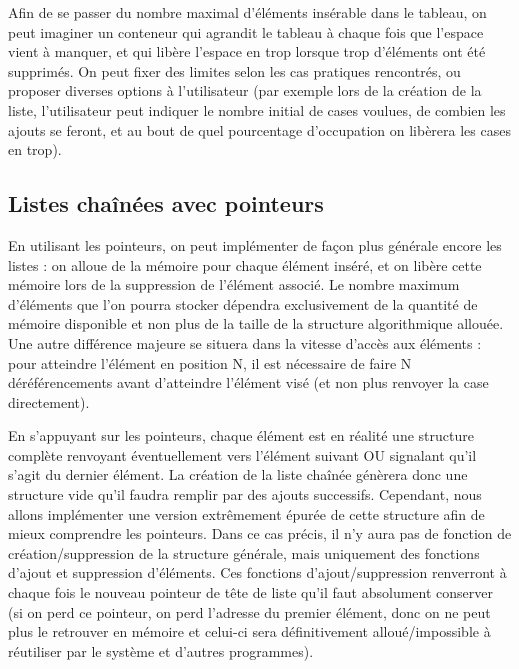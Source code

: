 \documentclass[11pt,a4paper]{article}
\begin{document}
Afin de se passer du nombre maximal d'éléments insérable dans le tableau, on peut imaginer un conteneur qui agrandit le tableau à chaque fois que l'espace vient à manquer, et qui libère l'espace en trop lorsque trop d'éléments ont été supprimés.
On peut fixer des limites selon les cas pratiques rencontrés, ou proposer diverses options à l'utilisateur (par exemple lors de la création de la liste, l'utilisateur peut indiquer le nombre initial de cases voulues, de combien les ajouts se feront, et au bout de quel pourcentage d'occupation on libèrera les cases en trop).


\bigskip


\subsection{Listes chaînées avec pointeurs}

\bigskip

En utilisant les pointeurs, on peut implémenter de façon plus générale encore les listes : on alloue de la mémoire pour chaque élément inséré, et on libère cette mémoire lors de la suppression de l'élément associé.
Le nombre maximum d'éléments que l'on pourra stocker dépendra exclusivement de la quantité de mémoire disponible et non plus de la taille de la structure algorithmique allouée.
Une autre différence majeure se situera dans la vitesse d'accès aux éléments : pour atteindre l'élément en position N, il est nécessaire de faire N déréférencements avant d'atteindre l'élément visé (et non plus renvoyer la case directement).

\medskip

En s'appuyant sur les pointeurs, chaque élément est en réalité une structure complète renvoyant éventuellement vers l'élément suivant OU signalant qu'il s'agit du dernier élément.
La création de la liste chaînée génèrera donc une structure vide qu'il faudra remplir par des ajouts successifs.
Cependant, nous allons implémenter une version extrêmement épurée de cette structure afin de mieux comprendre les pointeurs.
Dans ce cas précis, il n'y aura pas de fonction de création/suppression de la structure générale, mais uniquement des fonctions d'ajout et suppression d'éléments.
Ces fonctions d'ajout/suppression renverront à chaque fois le nouveau pointeur de tête de liste qu'il faut absolument conserver (si on perd ce pointeur, on perd l'adresse du premier élément, donc on ne peut plus le retrouver en mémoire et celui-ci sera définitivement alloué/impossible à réutiliser par le système et d'autres programmes).
\end{document}
